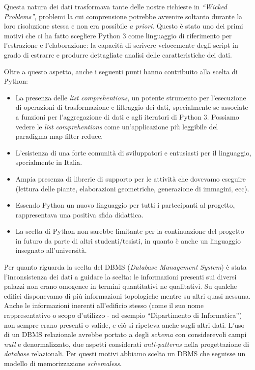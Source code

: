 \documentclass[12pt]{report}
\begin{document}
Questa natura dei dati trasformava tante delle nostre richieste in \textit{``Wicked Problems''}, problemi la cui comprensione potrebbe avvenire soltanto durante la loro risoluzione stessa e non era possibile \textit{a priori}. Questo è stato uno dei primi motivi che ci ha fatto scegliere Python 3 come linguaggio di riferimento per l'estrazione e l'elaborazione: la capacità di scrivere velocemente degli script in grado di estrarre e produrre dettagliate analisi delle caratteristiche dei dati. 

Oltre a questo aspetto, anche i seguenti punti hanno contribuito alla scelta di Python:
\begin{itemize}
  \item La presenza delle \textit{list comprehentions}, un potente strumento per l'esecuzione di operazioni di trasformazione e filtraggio dei dati, specialmente se associate a funzioni per l'aggregazione di dati e agli iteratori di Python 3. Possiamo vedere le \textit{list comprehentions} come un'applicazione più leggibile del paradigma map-filter-reduce.
  \item L'esistenza di una forte comunità di sviluppatori e entusiasti per il linguaggio, specialmente in Italia.
  \item Ampia presenza di librerie di supporto per le attività che dovevamo eseguire (lettura delle piante, elaborazioni geometriche, generazione di immagini, ecc).
  \item Essendo Python un nuovo linguaggio per tutti i partecipanti al progetto, rappresentava una positiva sfida didattica.
  \item La scelta di Python non sarebbe limitante per la continuazione del progetto in futuro da parte di altri studenti/tesisti, in quanto è anche un linguaggio insegnato all'università.
\end{itemize}

Per quanto riguarda la scelta del DBMS (\textit{Database Management System}) è stata l'inconsistenza dei dati a guidare la scelta: le informazioni presenti sui diversi palazzi non erano omogenee in termini quantitativi ne qualitativi. Su qualche edifici disponevamo di più informazioni topologiche mentre su altri quasi nessuna. Anche le informazioni inerenti all'edificio stesso (come il suo nome rappresentativo o scopo d'utilizzo - ad esempio ``Dipartimento di Informatica'') non sempre erano presenti o valide, e ciò si ripeteva anche sugli altri dati. L'uso di un DBMS relazionale avrebbe portato a degli \textit{schema} con considerevoli campi \textit{null} e denormalizzato, due aspetti considerati \textit{anti-patterns} nella progettazione di \textit{database} relazionali. Per questi motivi abbiamo scelto un DBMS che seguisse un modello di memorizzazione \textit{schemaless}. 
\end{document}
